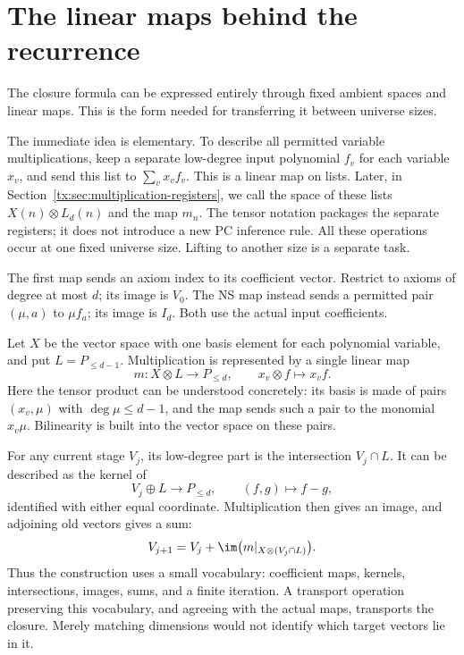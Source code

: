 \section{The linear maps behind the recurrence}
The closure formula can be expressed entirely through fixed ambient
spaces and linear maps. This is the form needed for transferring it
between universe sizes.

The immediate idea is elementary. To describe all permitted variable
multiplications, keep a separate low-degree input polynomial $f_v$
for each variable $x_v$, and send this list to $\sum_v x_vf_v$.
This is a linear map on lists. Later, in
Section~\ref{tx:sec:multiplication-registers}, we call the space of
these lists $X(n)\otimes L_d(n)$ and the map $m_n$.
The tensor notation packages the separate registers; it does not
introduce a new PC inference rule. All these operations occur at
one fixed universe size. Lifting to another size is a separate task.

The first map sends an axiom index to its coefficient vector. Restrict
to axioms of degree at most $d$; its image is $V_0$. The NS map instead
sends a permitted pair $(\mu,a)$ to $\mu f_a$; its image is $I_d$.
Both use the actual input coefficients.

Let $X$ be the vector space with one basis element for each polynomial
variable, and put $L=P_{\le d-1}$. Multiplication is represented by a
single linear map
\[
              m:X\otimes L\longrightarrow P_{\le d},
                         \qquad x_v\otimes f\longmapsto x_vf.
\]
Here the tensor product can be understood concretely: its basis is
made of pairs $(x_v,\mu)$ with $\deg\mu\le d-1$, and the map sends
such a pair to the monomial $x_v\mu$. Bilinearity is built into the
vector space on these pairs.

For any current stage $V_j$, its low-degree part is the intersection
$V_j\cap L$. It can be described as the kernel of
\[
                  V_j\oplus L\longrightarrow P_{\le d},
                              \qquad(f,g)\longmapsto f-g,
\]
identified with either equal coordinate. Multiplication then gives an
image, and adjoining old vectors gives a sum:
\[
 V_{j+1}=V_j+\im\bigl(m|_{X\otimes(V_j\cap L)}\bigr).
\]
Thus the construction uses a small vocabulary: coefficient maps,
kernels, intersections, images, sums, and a finite iteration. A
transport operation preserving this vocabulary, and agreeing with the
actual maps, transports the closure. Merely matching dimensions would
not identify which target vectors lie in it.

